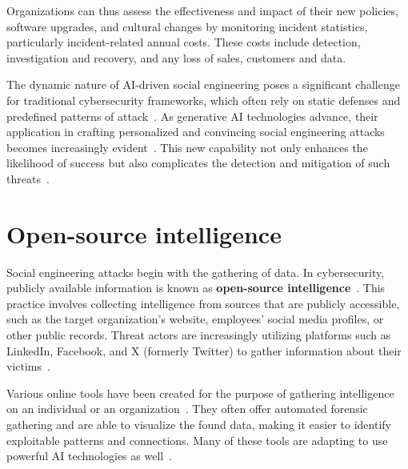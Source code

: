 Organizations can thus assess the effectiveness and impact of their new policies, software upgrades, and cultural changes by monitoring incident statistics, particularly incident-related annual costs. These costs include detection, investigation and recovery, and any loss of sales, customers and data. %






%
%
The dynamic nature of AI-driven social engineering poses a significant challenge for traditional cybersecurity frameworks, which often rely on static defenses and predefined patterns of attack~\citep{fakhouri_AI_Driven_Solutions_SE_Attacks_2024}. As generative AI technologies advance, their application in crafting personalized and convincing social engineering attacks becomes increasingly evident~\citep{blauth_AI_Crime_Overview_Malicious_Use_Abuse_2022}. This new capability not only enhances the likelihood of success but also complicates the detection and mitigation of such threats~\citep{mirsky_Threat_Offensive_AI_Organizations_2023}.











\section{Open-source intelligence}

Social engineering attacks begin with the gathering of data. In cybersecurity, publicly available information is known as \textbf{open-source intelligence}~\citep{hadnagy_Social_Engineering_The_Science_2018}. This practice involves collecting intelligence from sources that are publicly accessible, such as the target organization's website, employees' social media profiles, or other public records. Threat actors are increasingly utilizing platforms such as LinkedIn, Facebook, and X (formerly Twitter) to gather information about their victims~\citep{fakhouri_AI_Driven_Solutions_SE_Attacks_2024}.

Various online tools have been created for the purpose of gathering intelligence on an individual or an organization~\citep{mirsky_Threat_Offensive_AI_Organizations_2023}. They often offer automated forensic gathering and are able to visualize the found data, making it easier to identify exploitable patterns and connections. Many of these tools are adapting to use powerful AI technologies as well~\citep{wang_Defining_Social_Engineering_2020}.

